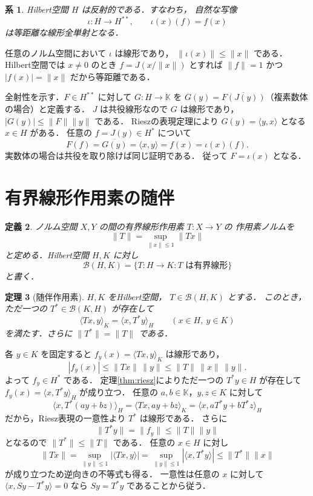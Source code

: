 \documentclass[a5paper,10pt,onecolumn]{jsarticle}
\makeatletter
\theoremstyle{mathnotetheorem}
\newtheorem{theorem}{定理}[section]
\newtheorem{definition}[theorem]{定義}
\newtheorem{corollary}[theorem]{系}
\renewcommand{\proofname}{証明}
\renewenvironment{proof}[1][\proofname]{%
  \par\pushQED{\qed}\normalfont\topsep4\p@\@plus2\p@\relax
  \trivlist\item[\hskip\labelsep\bfseries #1]\ignorespaces
}{\popQED\endtrivlist\@endpefalse}
\makeatother
\begin{document}
\begin{corollary}
Hilbert空間 $H$ は反射的である．すなわち，
自然な写像
\[
 \iota:H\to H^{**},\qquad
 \iota(x)(f)=f(x)
\]
は等距離な線形全単射となる．
\end{corollary}
\begin{proof}
任意のノルム空間において $\iota$ は線形であり，
$\|\iota(x)\|\le\|x\|$ である．Hilbert空間では
$x\ne0$ のとき $f=J(x/\|x\|)$ とすれば
$\|f\|=1$ かつ $|f(x)|=\|x\|$ だから等距離である．

全射性を示す．$F\in H^{**}$ に対して
$G:H\to\mathbb K$ を
$G(y)=\overline{F(J(y))}$（複素数体の場合）と定義する．
$J$ は共役線形なので $G$ は線形であり，
$|G(y)|\le\|F\|\|y\|$ である．
Rieszの表現定理により
$G(y)=\langle y,x\rangle$ となる $x\in H$ がある．
任意の $f=J(y)\in H^*$ について
\[
 F(f)=\overline{G(y)}
 =\langle x,y\rangle=f(x)=\iota(x)(f).
\]
実数体の場合は共役を取り除けば同じ証明である．
従って $F=\iota(x)$ となる．
\end{proof}

\section{有界線形作用素の随伴}

\begin{definition}
ノルム空間 $X,Y$ の間の有界線形作用素 $T:X\to Y$ の
作用素ノルムを
\[
 \|T\|=\sup_{\|x\|\le1}\|Tx\|
\]
と定める．Hilbert空間 $H,K$ に対し
\[
 \mathcal B(H,K)
 =\{T:H\to K:T\text{ は有界線形}\}
\]
と書く．
\end{definition}

\begin{theorem}[随伴作用素]\label{thm:adjoint}
$H,K$ をHilbert空間，
$T\in\mathcal B(H,K)$ とする．
このとき，ただ一つの $T^*\in\mathcal B(K,H)$ が存在して
\[
 \langle Tx,y\rangle_K
 =\langle x,T^*y\rangle_H
 \qquad(x\in H,\ y\in K)
\]
を満たす．さらに $\|T^*\|=\|T\|$ である．
\end{theorem}
\begin{proof}
各 $y\in K$ を固定すると
$f_y(x)=\langle Tx,y\rangle_K$ は線形であり，
\[
 |f_y(x)|\le\|Tx\|\,\|y\|
 \le\|T\|\,\|x\|\,\|y\|.
\]
よって $f_y\in H^*$ である．
定理\ref{thm:riesz}によりただ一つの $T^*y\in H$ が存在して
$f_y(x)=\langle x,T^*y\rangle_H$ が成り立つ．
任意の $a,b\in\mathbb K$，$y,z\in K$ に対して
\[
 \langle x,T^*(ay+bz)\rangle_H
 =\langle Tx,ay+bz\rangle_K
 =\langle x,aT^*y+bT^*z\rangle_H
\]
だから，Riesz表現の一意性より $T^*$ は線形である．
さらに
\[
 \|T^*y\|=\|f_y\|\le\|T\|\|y\|
\]
となるので $\|T^*\|\le\|T\|$ である．
任意の $x\in H$ に対し
\[
 \|Tx\|
 =\sup_{\|y\|\le1}|\langle Tx,y\rangle|
 =\sup_{\|y\|\le1}|\langle x,T^*y\rangle|
 \le\|T^*\|\|x\|
\]
が成り立つため逆向きの不等式も得る．
一意性は任意の $x$ に対して
$\langle x,Sy-T^*y\rangle=0$ なら
$Sy=T^*y$ であることから従う．
\end{proof}
\end{document}
